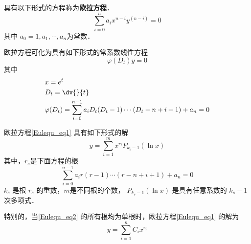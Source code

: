 
\begin{issues}
\issueDraft
\issueTODO
\end{issues}

具有以下形式的方程称为\textbf{欧拉方程}．
\begin{equation}\label{Eulequ_eq1}
\sum_{i=0}^{n}a_ix^{n-i}y^{(n-i)}=0
\end{equation}
其中 $a_0=1,a_1,\cdots,a_n$为常数．

欧拉方程可化为具有如下形式的常系数线性方程
\begin{equation}
\varphi(D_t)y=0
\end{equation}
其中
\begin{equation}
\begin{aligned}
&x=e^t\\
&D_t=\dv{}{t}\\
&\varphi(D_t)=\sum_{i=0}^{n-1}a_iD_t(D_t-1)\cdots(D_t-n+i+1)+a_n=0
\end{aligned}
\end{equation}

欧拉方程\autoref{Eulequ_eq1} 具有如下形式的解
\begin{equation}
y=\sum_{i=1}^mx^{r_i}P_{k_i-1}(\ln x)
\end{equation}
其中，$r_s$是下面方程的根
\begin{equation}\label{Eulequ_eq2}
\sum_{i=0}^{n-1}a_ir(r-1)\cdots(r-n+i+1)+a_n=0
\end{equation}
$k_s$ 是根 $r_s$ 的重数，$m$是不同根的个数， $P_{k_s-1}(\ln x)$ 是具有任意系数的 $k_s-1$ 次多项式． 

特别的，当\autoref{Eulequ_eq2} 的所有根均为单根时，欧拉方程\autoref{Eulequ_eq1} 的解为
\begin{equation}
y=\sum_{i=1}^{n}C_ix^{r_i}
\end{equation}

